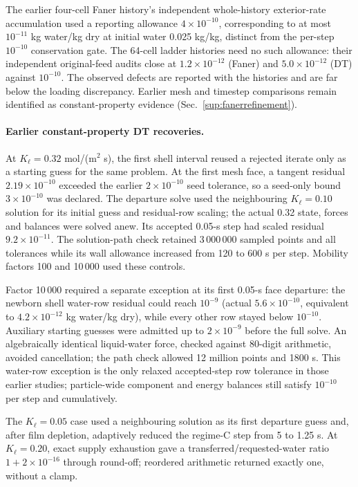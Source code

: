 The earlier four-cell Faner history's independent whole-history
exterior-rate accumulation used a reporting allowance $4\times10^{-10}$,
corresponding to at most $10^{-11}$ kg water/kg dry at initial water
0.025 kg/kg, distinct from the per-step $10^{-10}$ conservation gate. The
64-cell ladder histories need no such allowance: their independent
original-feed audits close at $1.2\times10^{-12}$ (Faner) and
$5.0\times10^{-12}$ (DT) against $10^{-10}$. The observed
defects are reported with the histories and are far below the loading
discrepancy. Earlier mesh and timestep comparisons remain identified as
constant-property evidence (Sec.~\ref{sup:fanerrefinement}).

\paragraph{Earlier constant-property DT recoveries.}
\label{sup:numericalcontrols:dt}
At $K_\ell=0.32$ mol/(m$^2$ s), the first shell interval reused a rejected
iterate only as a starting guess for the same problem. At the first mesh
face, a tangent residual $2.19\times10^{-10}$ exceeded the earlier
$2\times10^{-10}$ seed tolerance, so a seed-only bound
$3\times10^{-10}$ was declared. The departure solve used the neighbouring
$K_\ell=0.10$ solution for its initial guess and residual-row scaling;
the actual 0.32 state, forces and balances were solved anew. Its accepted
0.05-s step had scaled residual $9.2\times10^{-11}$. The solution-path
check retained 3\,000\,000 sampled points and all tolerances while its
wall allowance increased from 120 to 600 s per step. Mobility factors
100 and 10\,000 used these controls.

Factor 10\,000 required a separate exception at its first 0.05-s face
departure: the newborn shell water-row residual could reach $10^{-9}$
(actual $5.6\times10^{-10}$, equivalent to $4.2\times10^{-12}$ kg water/kg
dry), while every other row stayed below $10^{-10}$. Auxiliary starting
guesses were admitted up to $2\times10^{-9}$ before the full solve.
An algebraically identical liquid-water force, checked against 80-digit
arithmetic, avoided cancellation; the path check allowed 12 million points
and 1800 s. This water-row exception is the only relaxed accepted-step
row tolerance in those earlier studies; particle-wide component and energy
balances still satisfy $10^{-10}$ per step and cumulatively.

The $K_\ell=0.05$ case used a neighbouring solution as its first departure
guess and, after film depletion, adaptively reduced the regime-C step
from 5 to 1.25 s. At $K_\ell=0.20$, exact supply exhaustion gave a
transferred/requested-water ratio $1+2\times10^{-16}$ through round-off;
reordered arithmetic returned exactly one, without a clamp.

